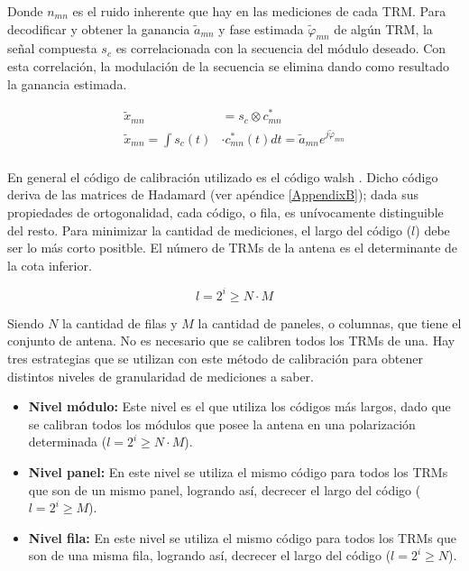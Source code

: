 Donde $n_{mn}$ es el ruido inherente que hay en las mediciones de cada TRM. Para decodificar y obtener la ganancia
$\tilde{a}_{mn}$ y fase estimada $\tilde\varphi_{mn}$ de algún TRM, la señal compuesta $s_c$ es correlacionada con
la secuencia del módulo deseado. Con esta correlación, la modulación de la secuencia se elimina dando como resultado
la ganancia estimada.

\begin{equation}
\begin{aligned}
	\tilde{x}_{mn} &= s_c \otimes c^*_{mn} \\
	\tilde{x}_{mn} = \int s_c(t) &\cdot c^*_{mn}(t) dt = \tilde{a}_{mn}e^{j\tilde{\varphi}_{mn}} \\
\end{aligned}
\label{eq:classic_correlation}
\end{equation}

En general el código de calibración utilizado es el código walsh \cite{WalshCode}. Dicho código deriva de las matrices de 
Hadamard (ver apéndice \ref{AppendixB}); dada sus propiedades de ortogonalidad, cada código, o fila, es unívocamente 
distinguible del resto. Para minimizar la cantidad de mediciones, el largo del código ($l$) debe ser lo más corto positble. 
El número de TRMs de la antena es el determinante de la cota inferior.

\begin{equation}
	l = 2^i \ge N \cdot M
\end{equation}

Siendo $N$ la cantidad de filas y $M$ la cantidad de paneles, o columnas, que tiene el conjunto de antena. No es necesario que
se calibren todos los TRMs de una. Hay tres estrategias que se utilizan con este método de calibración para obtener
distintos niveles de granularidad de mediciones a saber.

\begin{itemize}
	\item \textbf{Nivel módulo:} Este nivel es el que utiliza los códigos más largos, dado que se calibran todos los módulos que
		posee la antena en una polarización determinada ($l = 2^i \ge N \cdot M$).
	\item \textbf{Nivel panel:} En este nivel se utiliza el mismo código para todos los TRMs que son de un mismo panel,
		logrando así, decrecer el largo del código ($l = 2^i \ge M$).
	\item \textbf{Nivel fila:} En este nivel se utiliza el mismo código para todos los TRMs que son de una misma fila,
		logrando así, decrecer el largo del código ($l = 2^i \ge N$).
\end{itemize}

